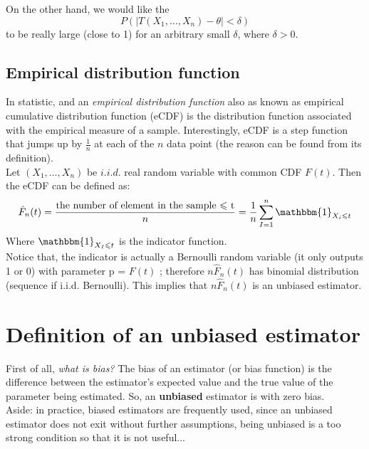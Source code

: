 \documentclass[12pt ]{article}
\begin{document}
\color{black}
On the other hand, we would like the 
\begin{equation}
P(|T(X_{1}, \ldots, X_{n}) - \theta| < \delta)
\end{equation}
to be really large (close to 1) for an arbitrary small $\delta$, where $\delta > 0$.

\subsection{Empirical distribution function}
In statistic, and an \textit{empirical distribution function} also as known as empirical cumulative distribution function (eCDF) is the distribution function associated with the empirical measure of a sample. Interestingly, eCDF is a step function that jumps up by $\frac{1}{n}$ at each of the $n$ data point (the reason can be found from its definition). \\


Let  $(X_{1}, \ldots, X_{n})$ be $i.i.d.$ real random variable with common CDF $F(t)$. Then the eCDF can be defined as:
\begin{equation}
\hat{F}_{n}(t) = \frac{\text{the number of element in the sample $\leqslant$ t}}{n} = \frac{1}{n} \sum_{I=1}^{n} \mathbbm{1}_{X_{i} \leqslant t}
\end{equation} 
Where $\mathbbm{1}_{X_{I}\leqslant t}$ is the indicator function. \\

Notice that, the indicator is actually a Bernoulli random variable (it only outputs 1 or 0) with parameter p = $F(t)$ ; therefore $n\hat{F}_{n}(t)$ has binomial distribution (sequence if i.i.d. Bernoulli). This implies that $n\hat{F}_{n}(t)$ is an unbiased estimator.

\section{Definition of an unbiased estimator}
First of all, \textit{what is bias?} The bias of an estimator (or bias function) is the difference between the estimator's expected value and the true value of the parameter being estimated. So, an \textbf{unbiased} estimator is with zero bias.\\
\color{brown}
Aside: in practice, biased estimators are frequently used, since an unbiased estimator does not exit without further assumptions, being unbiased is a too strong condition so that it is not useful... \\
\end{document}

